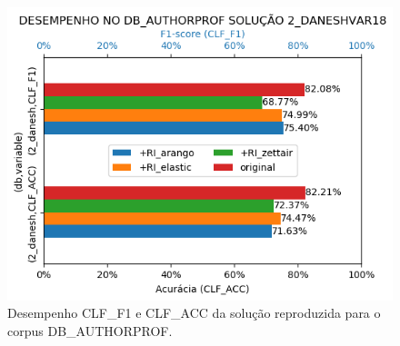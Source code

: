 \begin{figure}[h]
    \centering
    \caption{Desempenho CLF\_F1 e CLF\_ACC da solução reproduzida para o corpus DB\_AUTHORPROF.}
    \vspace{-0.5cm}
    \begin{center}
        \includegraphics[scale=0.75]{img/clf-bars-authorprof.png}
    \end{center}
    \vspace{-0.5cm}
    \label{fig:clf-bars-authorprof}
\end{figure}